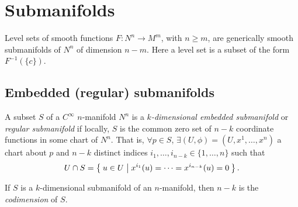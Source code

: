 \section{Submanifolds}
Level sets of smooth functions $F: N^n \to M^m$, with $n \geq m$, are
generically smooth submanifolds of $N^n$ of dimension $n - m$. Here a
level set is a subset of the form $F^{-1}(\{c\})$.

\subsection{Embedded (regular) submanifolds}

\begin{defn}
A subset $S$ of a $C^\infty$ $n$-manifold $N^n$ is a
\emph{$k$-dimensional embedded submanifold} or \emph{regular submanifold} if
locally, $S$ is the common zero set of $n - k$ coordinate functions in
some chart of $N^n$. That is,
$\forall p \in S$, $\exists (U, \phi) = (U, x^1, \dots, x^n)$ a chart
about $p$ and $n - k$ distinct indices $i_1, \dots, i_{n-k} \in \{ 1,
\dots, n \}$ such that
$$
U \cap S = \Set{ u \in U | x^{i_1}(u) = \cdots = x^{i_{n-k}}(u) = 0 }.
$$
\end{defn}

\begin{defn}[Codimension]
If $S$ is a $k$-dimensional submanifold of an $n$-manifold, then $n -
k$ is the \emph{codimension} of $S$.
\end{defn}

